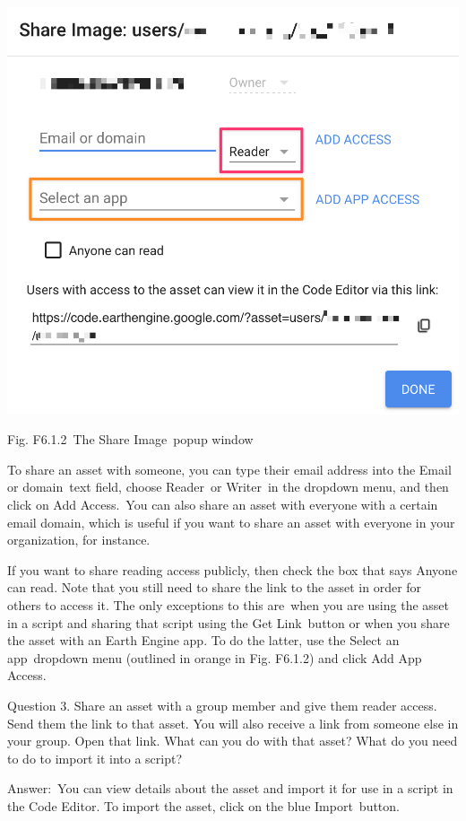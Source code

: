 \documentclass[
  letterpaper,
  DIV=11,
  numbers=noendperiod]{scrreprt}
\begin{document}
\includegraphics{./F6/image10.png}

Fig. F6.1.2~The Share Image~popup window

To share an asset with someone, you can type their email address into
the Email or domain~text field, choose Reader~or Writer~in the dropdown
menu, and then click on Add Access.~You can also share an asset with
everyone with a certain email domain, which is useful if you want to
share an asset with everyone in your organization, for instance.

If you want to share reading access publicly, then check the box that
says Anyone can read. Note that you still need to share the link to the
asset in order for others to access it. The only exceptions to this
are~when you are using the asset in a script and sharing that script
using the Get Link~button or when you share the asset with an Earth
Engine app. To do the latter, use the Select an app~dropdown menu
(outlined in orange in Fig. F6.1.2) and click Add App Access.

Question 3. Share an asset with a group member and give them reader
access. Send them the link to that asset. You will also receive a link
from someone else in your group. Open that link. What can you do with
that asset? What do you need to do to import it into a script?

Answer:~You can view details about the asset and import it for use in a
script in the Code Editor. To import the asset, click on the blue
Import~button.
\end{document}
